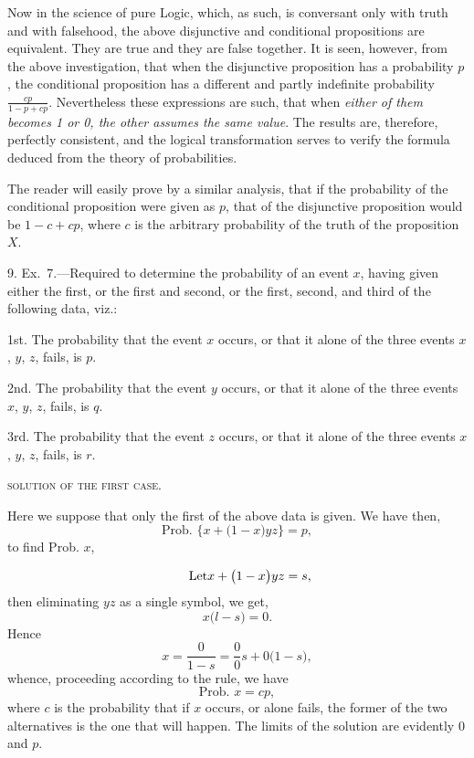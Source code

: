 \documentclass[oneside]{book}
\begin{document}
Now in the science of pure Logic, which, as such, is conversant
only with truth and with falsehood, the above disjunctive
and conditional propositions are equivalent. They are true and
they are false together. It is seen, however, from the above investigation,
that when the disjunctive proposition has a probability
$p$, the conditional proposition has a different and partly indefinite
probability $\frac{cp}{1-p+cp}$. Nevertheless these expressions
are such, that when \emph{either of them becomes 1 or 0, the other assumes
the same value}. The results are, therefore, perfectly consistent,
and the logical transformation serves to verify the formula
deduced from the theory of probabilities.

The reader will easily prove by a similar analysis, that if the
probability of the conditional proposition were given as $p$, that
of the disjunctive proposition would be $1-c+cp$, where $c$ is the
arbitrary probability of the truth of the proposition $X$.

9. Ex.~7.---Required to determine the probability of an event
$x$, having given either the first, or the first and second, or the
first, second, and third of the following data, viz.:

1st. The probability that the event $x$ occurs, or that it alone
of the three events $x$, $y$, $z$, fails, is $p$.

2nd. The probability that the event $y$ occurs, or that it alone
of the three events $x$, $y$, $z$, fails, is $q$.

3rd. The probability that the event $z$ occurs, or that it alone
of the three events $x$, $y$, $z$, fails, is $r$.


\begin{center}\textsc{solution of the first case.}\end{center}

Here we suppose that only the first of the above data is
given.
We have then,
\[
  \textrm{Prob. }\{x + \bigl( 1 - x \bigr) yz\} = p,
\]
to find Prob. $x$,

\[
  \qquad\textrm{Let}\hfill  x + \bigl( 1 - x \bigr) yz = s, \hfill
\]
then eliminating $yz$ as a single symbol, we get,
\begin{equation*}
x\bigl( l - s \bigr) = 0.
\end{equation*}
Hence
\begin{equation*}
x = \frac{0}{1-s} = \frac{0}{0}s + 0\bigl( 1-s \bigr),
\end{equation*}
whence, proceeding according to the rule, we have
\[
  \textrm{Prob. }x = cp,    \tag{1}
\]
where $c$ is the probability that if $x$ occurs, or alone fails, the
former of the two alternatives is the one that will happen. The
limits of the solution are evidently $0$ and $p$.
\end{document}
